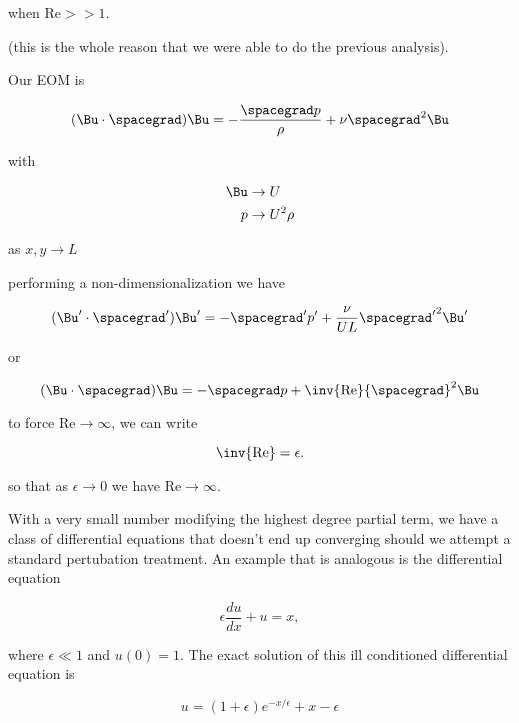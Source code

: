 when $\text{Re} >> 1$.

(this is the whole reason that we were able to do the previous analysis).

Our EOM is

\begin{equation}\label{eqn:continuumL19:n}
(\Bu \cdot \spacegrad) \Bu = -\frac{\spacegrad p}{\rho } + \nu \spacegrad^2 \Bu
\end{equation}

with 

\begin{align}\label{eqn:continuumL19:n}
\Bu &\rightarrow U \\
p &\rightarrow U^2 \rho
\end{align}

as $x, y \rightarrow L$

performing a non-dimensionalization we have

\begin{equation}\label{eqn:continuumL19:n}
(\Bu' \cdot \spacegrad') \Bu' = -\spacegrad' p' + \frac{\nu}{U L} {\spacegrad'}^2 \Bu'
\end{equation}

or

\begin{equation}\label{eqn:continuumL19:n}
(\Bu \cdot \spacegrad) \Bu = -\spacegrad p + \inv{\text{Re}} {\spacegrad}^2 \Bu
\end{equation}

to force $\text{Re} \rightarrow \infty$, we can write

\begin{equation}\label{eqn:continuumL19:n}
\inv{\text{Re}} = \epsilon.
\end{equation}

so that as $\epsilon \rightarrow 0$ we have $\text{Re} \rightarrow \infty$.

With a very small number modifying the highest degree partial term, we have a class of differential equations that doesn't end up converging should we attempt a standard pertubation treatment.  An example that is analogous is the differential equation

\begin{equation}\label{eqn:continuumL19:n}
\epsilon \frac{du}{dx} + u = x,
\end{equation}

where $\epsilon \ll 1$ and $u(0) = 1$.  The exact solution of this ill conditioned differential equation is

\begin{equation}\label{eqn:continuumL19:n}
u = (1 + \epsilon) e^{-x/\epsilon} + x - \epsilon
\end{equation}

